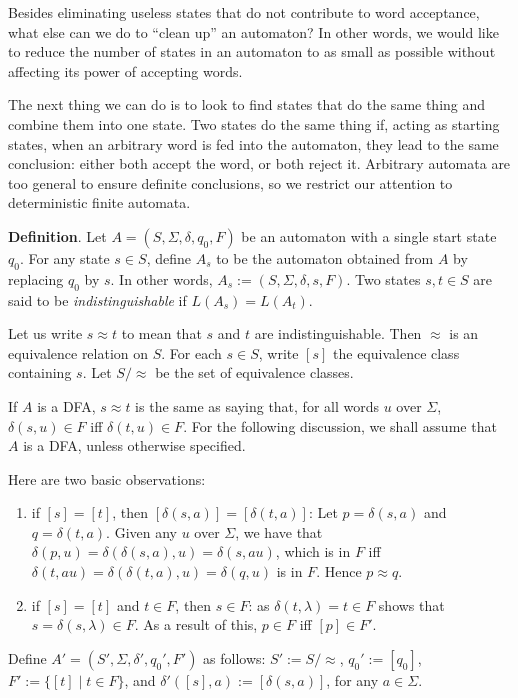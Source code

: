 \documentclass[12pt]{article}
\begin{document}
Besides eliminating useless states that do not contribute to word acceptance, what else can we do to ``clean up'' an automaton?  In other words, we would like to reduce the number of states in an automaton to as small as possible without affecting its power of accepting words.  

The next thing we can do is to look to find states that do the same thing and combine them into one state.  Two states do the same thing if, acting as starting states, when an arbitrary word is fed into the automaton, they lead to the same conclusion: either both accept the word, or both reject it.  Arbitrary automata are too general to ensure definite conclusions, so we restrict our attention to deterministic finite automata.

\textbf{Definition}.  Let $A=(S,\Sigma,\delta,q_0,F)$ be an automaton with a single start state $q_0$.  For any state $s\in S$, define $A_s$ to be the automaton obtained from $A$ by replacing $q_0$ by $s$.  In other words, $A_s:=(S,\Sigma,\delta,s,F)$.  Two states $s,t\in S$ are said to be \emph{indistinguishable} if $L(A_s)=L(A_t)$.

Let us write $s\approx t$ to mean that $s$ and $t$ are indistinguishable.  Then $\approx$ is an equivalence relation on $S$.  For each $s\in S$, write $[s]$ the equivalence class containing $s$.  Let $S/\approx$ be the set of equivalence classes.

If $A$ is a DFA, $s \approx t$ is the same as saying that, for all words $u$ over $\Sigma$, $\delta(s,u)\in F$ iff $\delta(t,u)\in F$.  For the following discussion, we shall assume that $A$ is a DFA, unless otherwise specified.

Here are two basic observations: 
\begin{enumerate}
\item if $[s]=[t]$, then $[\delta(s,a)]=[\delta(t,a)]$:  Let $p=\delta(s,a)$ and $q=\delta(t,a)$.  Given any $u$ over $\Sigma$, we have that $\delta(p,u)=\delta(\delta(s,a),u)=\delta(s,au)$, which is in $F$ iff $\delta(t,au)=\delta(\delta(t,a),u)=\delta(q,u)$ is in $F$.  Hence $p\approx q$.
\item if $[s]=[t]$ and $t\in F$, then $s\in F$: as $\delta(t,\lambda)=t\in F$ shows that $s=\delta(s,\lambda)\in F$.  As a result of this, $p\in F$ iff $[p]\in F'$.
\end{enumerate}

Define $A'=(S',\Sigma,\delta', q_0',F')$ as follows: $S':=S/\approx$, $q_0':= [q_0]$, $F':=\lbrace [t]\mid t\in F\rbrace$, and $\delta'([s],a):= [\delta(s,a)]$, for any $a\in \Sigma$.
\end{document}
